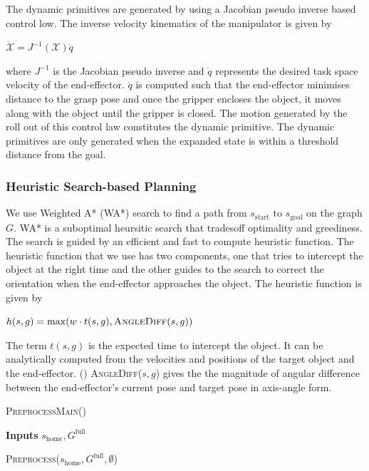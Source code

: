 The dynamic primitives are generated by using a Jacobian pseudo inverse based control low. The inverse velocity kinematics of the manipulator is given by
\begin{center}
$\dot{\mathcal{X}} = J^{-1}(\mathcal{X})\dot{q}$
\end{center}

where $J^{-1}$ is the Jacobian pseudo inverse and $\dot{q}$ represents the desired task space velocity of the end-effector. $\dot{q}$ is computed such that the end-effector minimises distance to the grasp pose and once the gripper encloses the object, it moves along with the object until the gripper is closed. The motion generated by the roll out of this control law constitutes the dynamic primitive. The dynamic primitives are only generated when the expanded state is within a threshold distance from the goal. 

\subsubsection{Heuristic Search-based Planning}
We use Weighted A* (WA*) search to find a path from $s_{\textrm{start}}$ to $s_{\textrm{goal}}$ on the graph $G$. WA* is a suboptimal heursitic search that tradesoff optimality and greediness. The search is guided by an efficient and fast to compute heuristic function. The heuristic function that we use has two components, one that tries to intercept the object at the right time and the other guides to the search to correct the orientation when the end-effector approaches the object. The heuristic function is given by

\begin{center}
$h(s,g) = \max (w \cdot t(s,g), \textsc{AngleDiff}(s,g))$
\end{center}


The term $t(s,g)$ is the expected time to intercept the object. It can be analytically computed from the velocities and positions of the target object and the end-effector.
()
\textsc{AngleDiff}($s,g$) gives the the magnitude of angular difference between the end-effector's current pose and target pose in axis-angle form.

\begin{algorithm}
\caption{\textsc{PreprocessMain()}}\label{alg:1}
\hspace*{\algorithmicindent} \textbf{Inputs} $s_{\textrm{home}}, G^{\textrm{full}}$ \\
\begin{algorithmic}[1]
\State \textsc{Preprocess}($s_{\textrm{home}},G^{\textrm{full}},\emptyset$)
\end{algorithmic}
\end{algorithm}

